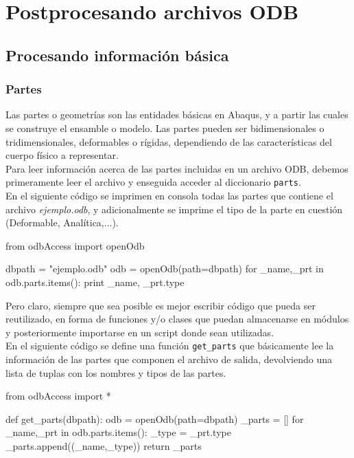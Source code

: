 \chapter{Postprocesando archivos ODB}

\section{Procesando información básica}

\subsection{Partes}

Las partes o geometrías son las entidades básicas en Abaqus, y a partir las cuales se construye el ensamble 
o modelo. Las partes pueden ser bidimensionales o tridimensionales, deformables o rígidas, dependiendo 
de las características del cuerpo físico a representar.\\

Para leer información acerca de las partes incluidas en un archivo ODB, debemos primeramente leer el archivo 
y enseguida acceder al diccionario \texttt{parts}.\\

En el siguiente código se imprimen en consola todas las partes que contiene el archivo \textit{ejemplo.odb}, 
y adicionalmente se imprime el tipo de la parte en cuestión (Deformable, Analítica,...).

\begin{python}
from odbAccess import openOdb

dbpath = "ejemplo.odb"
odb = openOdb(path=dbpath)
for _name,_prt in odb.parts.items():
	print _name, _prt.type
\end{python}

Pero claro, siempre que sea posible es mejor escribir código que pueda ser reutilizado, en forma de funciones y/o clases 
que puedan almacenarse en módulos y posteriormente importarse en un script donde sean utilizadas.\\

En el siguiente código se define una función {\tt get\_parts} que básicamente lee la información de las partes que 
componen el archivo de salida, devolviendo una lista de tuplas con los nombres y tipos de las partes.

\begin{python}
from odbAccess import *

def get_parts(dbpath):
	odb = openOdb(path=dbpath)
	_parts = []
	for _name,_prt in odb.parts.items():
		_type = _prt.type
		_parts.append((_name,_type))
	return _parts
\end{python}


